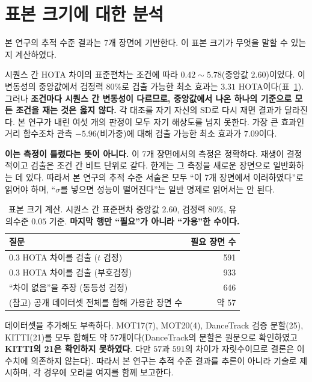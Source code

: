 \documentclass[12pt,a4paper,oneside]{report}
\begin{document}
\section{표본 크기에 대한 분석}\label{sec:6-5}

본 연구의 추적 수준 결과는 7개 장면에 기반한다. 이 표본 크기가 무엇을 말할 수 있는지 계산하였다.

시퀀스 간 HOTA 차이의 표준편차는 조건에 따라 $0.42 \sim 5.78$(중앙값 2.60)이었다. 이 변동성의 중앙값에서 검정력 80\%로 검출 가능한 최소 효과는 $3.31$ HOTA이다(표~\ref{tab:power}). 그러나 \textbf{조건마다 시퀀스 간 변동성이 다르므로, 중앙값에서 나온 하나의 기준으로 모든 조건을 재는 것은 옳지 않다.} 각 대조를 자기 자신의 SD로 다시 재면 결과가 달라진다. 본 연구가 내린 여섯 개의 판정이 모두 자기 해상도를 넘지 못한다. 가장 큰 효과인 거리 함수조차 관측 $-5.96$(비가중)에 대해 검출 가능한 최소 효과가 $7.09$이다.

\textbf{이는 측정이 틀렸다는 뜻이 아니다.} 이 7개 장면에서의 측정은 정확하다. 재생이 결정적이고 검출은 조건 간 비트 단위로 같다. 한계는 그 측정을 새로운 장면으로 일반화하는 데 있다. 따라서 본 연구의 추적 수준 서술은 모두 ``이 7개 장면에서 이러하였다''로 읽어야 하며, ``$\sigma$를 넣으면 성능이 떨어진다''는 일반 명제로 읽어서는 안 된다.

\begin{table}[htbp]
\centering
\small
\caption{표본 크기 계산. 시퀀스 간 표준편차 중앙값 $2.60$, 검정력 $80\%$, 유의수준 $0.05$ 기준. \textbf{마지막 행만 ``필요''가 아니라 ``가용''한 수이다.}}
\label{tab:power}
\begin{tabular}{lr}
\toprule
질문 & 필요 장면 수 \\
\midrule
0.3 HOTA 차이를 검출 ($t$ 검정) & 591 \\
0.3 HOTA 차이를 검출 (부호검정) & 933 \\
``차이 없음''을 주장 (동등성 검정) & 646 \\
\midrule
(참고) 공개 데이터셋 전체를 합해 가용한 장면 수 & 약 57 \\
\bottomrule
\end{tabular}
\end{table}

데이터셋을 추가해도 부족하다. MOT17(7), MOT20(4), DanceTrack 검증 분할(25), KITTI(21)를 모두 합해도 약 57개이다(DanceTrack의 분할은 원문으로 확인하였고 \textbf{KITTI의 21은 확인하지 못하였다}. 다만 $57$과 $591$의 차이가 자릿수이므로 결론은 이 수치에 의존하지 않는다). 따라서 본 연구는 추적 수준 결과를 추론이 아니라 기술로 제시하며, 각 경우에 오라클 여지를 함께 보고한다.
\end{document}

